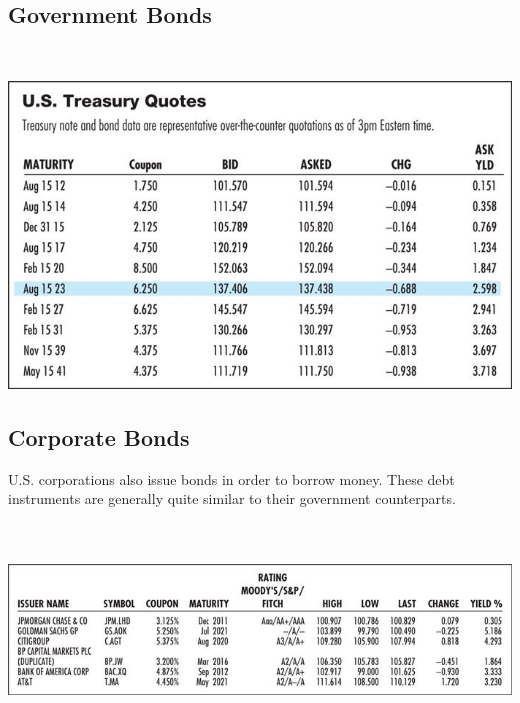 \documentclass[letterpaper,10pt,english]{sphinxmanual}
\begin{document}
\subsection{Government Bonds}
\label{bondPrices:id1}
$\qquad$

\includegraphics[width=6in]{bod34698_1001_lg.jpg}


\subsection{Corporate Bonds}
\label{bondPrices:corporate-bonds}
U.S. corporations also issue bonds in order to borrow money. These
debt instruments are generally quite similar to their government
counterparts.
\begin{gather}
\begin{split}\qquad\end{split}\notag\\\begin{split}\end{split}\notag
\end{gather}
\includegraphics[width=6in]{bod34698_1002_lg.jpg}
\end{document}
